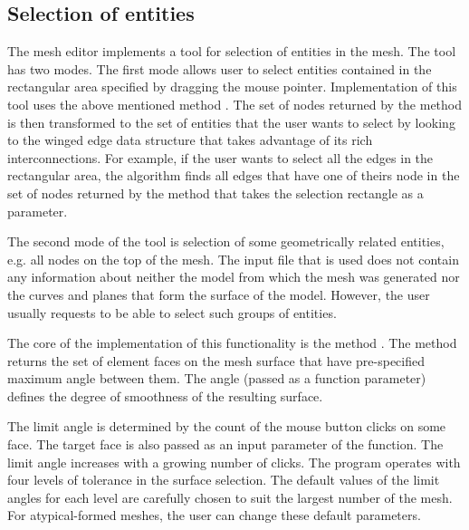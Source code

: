 
\subsection{Selection of entities}

The mesh editor implements a tool for selection of entities in the mesh. The tool has two modes. The first mode allows user to select entities contained in the rectangular area specified by dragging the mouse pointer. Implementation of this tool uses the above mentioned method . The set of nodes returned by the method is then transformed to the set of entities that the user wants to select by looking to the winged edge data structure that takes advantage of its rich interconnections. For example, if the user wants to select all the edges in the rectangular area, the algorithm finds all edges that have one of theirs node in the set of nodes returned by the method  that takes the selection rectangle as a parameter.

The second mode of the tool is selection of some geometrically related entities, e.g. all nodes on the top of the mesh. The input file that is used does not contain any information about neither the model from which the mesh was generated nor the curves and planes that form the surface of the model. However, the user usually requests to be able to select such groups of entities.

The core of the implementation of this functionality is the method . The method returns the set of element faces on the mesh surface that have pre-specified maximum angle between them. The angle (passed as a function parameter) defines the degree of smoothness of the resulting surface.

The limit angle is determined by the count of the mouse button clicks on some face. The target face is also passed as an input parameter of the function. The limit angle increases with a growing number of clicks. The program operates with four levels of tolerance in the surface selection. The default values of the limit angles for each level are carefully chosen to suit the largest number of the mesh. For atypical-formed meshes, the user can change these default parameters.

